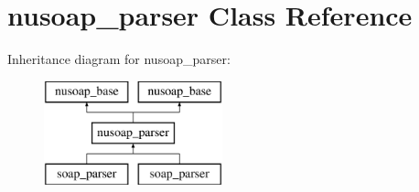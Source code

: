 \hypertarget{classnusoap__parser}{}\section{nusoap\+\_\+parser Class Reference}
\label{classnusoap__parser}
Inheritance diagram for nusoap\+\_\+parser\+:\begin{figure}[H]
\begin{center}
\leavevmode
\includegraphics[height=3.000000cm]{classnusoap__parser}
\end{center}
\end{figure}
